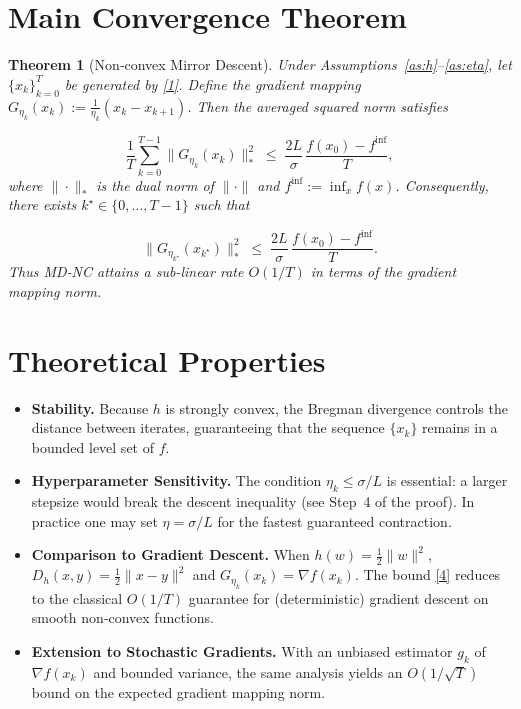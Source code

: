 \documentclass{article}
\newtheorem{theorem}{Theorem}
\newcommand{\Breg}[2]{D_{h}(#1,#2)}
\newcommand{\grad}{\nabla}
\begin{document}
\section*{Main Convergence Theorem}
\begin{theorem}[Non‑convex Mirror Descent]\label{thm:main}
Under Assumptions~\ref{as:h}--\ref{as:eta}, let $\{x_k\}_{k=0}^{T}$ be generated by \eqref{1}.  
Define the gradient mapping $G_{\eta_k}(x_k):=\frac1{\eta_k}(x_k-x_{k+1})$.  
Then the averaged squared norm satisfies  

\[
\frac{1}{T}\sum_{k=0}^{T-1}\|G_{\eta_k}(x_k)\|_{*}^{2}
\;\le\;
\frac{2L}{\sigma}\,\frac{f(x_0)-f^{\inf}}{T},
\tag{4}
\]
where $\|\cdot\|_{*}$ is the dual norm of $\|\cdot\|$ and $f^{\inf}:=\inf_{x}f(x)$.  
Consequently, there exists $k^{\star}\in\{0,\dots,T-1\}$ such that  

\[
\|G_{\eta_{k^{\star}}}(x_{k^{\star}})\|_{*}^{2}
\;\le\;
\frac{2L}{\sigma}\,\frac{f(x_0)-f^{\inf}}{T}.
\tag{5}
\]
Thus MD‑NC attains a sub‑linear rate $O(1/T)$ in terms of the gradient mapping norm.
\end{theorem}

\section*{Theoretical Properties}
\begin{itemize}
\item \textbf{Stability.} Because $h$ is strongly convex, the Bregman divergence controls the distance between iterates, guaranteeing that the sequence $\{x_k\}$ remains in a bounded level set of $f$.
\item \textbf{Hyperparameter Sensitivity.} The condition $\eta_k\le\sigma/L$ is essential: a larger stepsize would break the descent inequality (see Step~4 of the proof). In practice one may set $\eta=\sigma/L$ for the fastest guaranteed contraction.
\item \textbf{Comparison to Gradient Descent.} When $h(w)=\tfrac12\|w\|^{2}$, $\Breg{x}{y}=\tfrac12\|x-y\|^{2}$ and $G_{\eta_k}(x_k)=\grad f(x_k)$. The bound \eqref{4} reduces to the classical $O(1/T)$ guarantee for (deterministic) gradient descent on smooth non‑convex functions.
\item \textbf{Extension to Stochastic Gradients.} With an unbiased estimator $g_k$ of $\grad f(x_k)$ and bounded variance, the same analysis yields an $O(1/\sqrt{T})$ bound on the expected gradient mapping norm.
\end{itemize}
\end{document}
